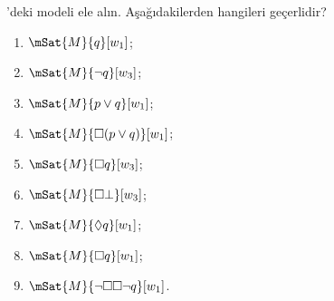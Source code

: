 \documentclass[../../../include/open-logic-section]{subfiles}
\begin{document}
\begin{prob}
  'deki modeli ele alın. Aşağıdakilerden
  hangileri geçerlidir?
    \begin{enumerate}
    \item $\mSat{M}{q}[w_1]$;
    \item $\mSat{M}{\lnot q}[w_3]$;
    \item $\mSat{M}{p \lor q}[w_1]$;
    \item $\mSat{M}{\Box (p \lor q)}[w_1]$;
    \item $\mSat{M}{\Box q}[w_3]$;
    \item $\mSat{M}{\Box \bot}[w_3]$;
    \item $\mSat{M}{\Diamond q}[w_1]$;
    \item $\mSat{M}{\Box q}[w_1]$;
    \item $\mSat{M}{\lnot \Box\Box \lnot q}[w_1]$.
    \end{enumerate}
\end{prob}
\end{document}
